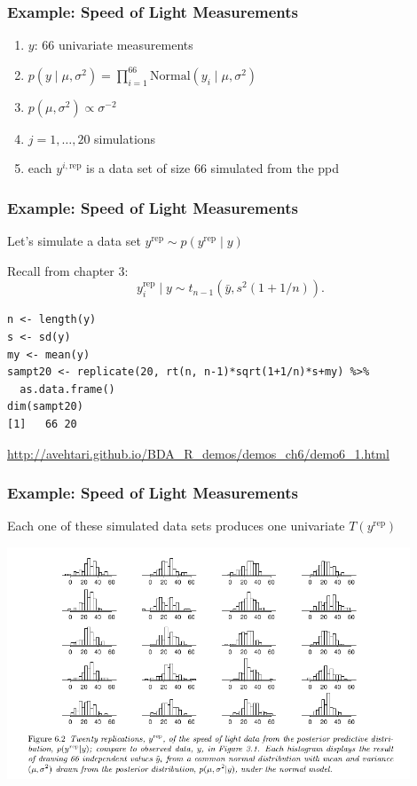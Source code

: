 \documentclass{beamer}
\begin{document}
\begin{frame}
\frametitle{Example: Speed of Light Measurements}

\begin{enumerate}
\item $y$: $66$ univariate measurements 
\item $p(y \mid \mu, \sigma^2) = \prod_{i=1}^{66}\text{Normal}(y_i \mid \mu, \sigma^2)$
\item $p(\mu, \sigma^2) \propto \sigma^{-2}$
\item $j = 1, \ldots, 20$ simulations
\item each $y^{i, \text{rep}}$ is a data set of size $66$ simulated from the ppd
\end{enumerate}


\end{frame}




\begin{frame}[fragile]
\frametitle{Example: Speed of Light Measurements}

Let's simulate a data set $y^{\text{rep}} \sim p(y^{\text{rep}} \mid y)$
\newline

Recall from chapter 3:
\[
y^{\text{rep}}_i \mid y \sim t_{n-1}(\bar{y}, s^2(1 + 1/n)).
\]

\begin{verbatim}
n <- length(y)
s <- sd(y)
my <- mean(y)
sampt20 <- replicate(20, rt(n, n-1)*sqrt(1+1/n)*s+my) %>%
  as.data.frame()
dim(sampt20)
[1]   66 20
\end{verbatim}
\url{http://avehtari.github.io/BDA_R_demos/demos_ch6/demo6_1.html}
\end{frame}

\begin{frame}
\frametitle{Example: Speed of Light Measurements}

Each one of these simulated data sets produces one univariate $T(y^{\text{rep}})$
\begin{center}
\includegraphics[width=120mm]{sim_data_sets.png}
\end{center}

\end{frame}
\end{document}
